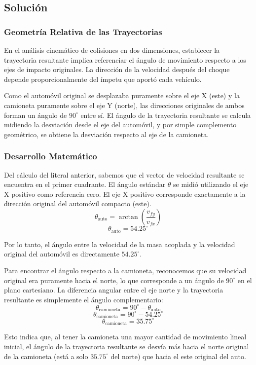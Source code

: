 \documentclass{article}
\begin{document}
\subsection*{Solución}

\subsubsection*{Geometría Relativa de las Trayectorias}
En el análisis cinemático de colisiones en dos dimensiones, establecer la trayectoria resultante implica referenciar el ángulo de movimiento respecto a los ejes de impacto originales. La dirección de la velocidad después del choque depende proporcionalmente del ímpetu que aportó cada vehículo. 

Como el automóvil original se desplazaba puramente sobre el eje X (este) y la camioneta puramente sobre el eje Y (norte), las direcciones originales de ambos forman un ángulo de $90^\circ$ entre sí. El ángulo de la trayectoria resultante se calcula midiendo la desviación desde el eje del automóvil, y por simple complemento geométrico, se obtiene la desviación respecto al eje de la camioneta.

\subsubsection*{Desarrollo Matemático}
Del cálculo del literal anterior, sabemos que el vector de velocidad resultante se encuentra en el primer cuadrante. El ángulo estándar $\theta$ se midió utilizando el eje X positivo como referencia cero.
El eje X positivo corresponde exactamente a la dirección original del automóvil compacto (este).
$$\theta_{\text{auto}} = \arctan\left(\frac{v_{fy}}{v_{fx}}\right)$$
$$\theta_{\text{auto}} = 54.25^\circ$$

Por lo tanto, el ángulo entre la velocidad de la masa acoplada y la velocidad original del automóvil es directamente $54.25^\circ$.

Para encontrar el ángulo respecto a la camioneta, reconocemos que su velocidad original era puramente hacia el norte, lo que corresponde a un ángulo de $90^\circ$ en el plano cartesiano. La diferencia angular entre el eje norte y la trayectoria resultante es simplemente el ángulo complementario:
$$\theta_{\text{camioneta}} = 90^\circ - \theta_{\text{auto}}$$
$$\theta_{\text{camioneta}} = 90^\circ - 54.25^\circ$$
$$\theta_{\text{camioneta}} = 35.75^\circ$$

Esto indica que, al tener la camioneta una mayor cantidad de movimiento lineal inicial, el ángulo de la trayectoria resultante se desvía más hacia el norte original de la camioneta (está a solo $35.75^\circ$ del norte) que hacia el este original del auto.
\end{document}
